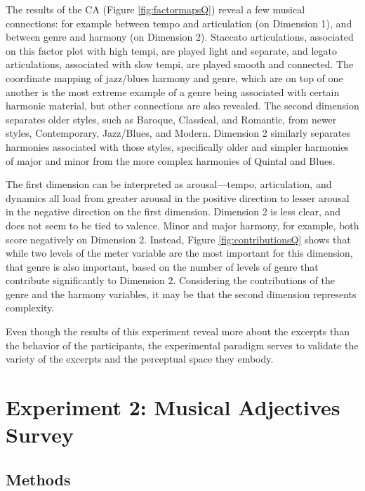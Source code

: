 \documentclass[
  english,
  man,floatsintext]{apa6}
\begin{document}
The results of the CA (Figure \ref{fig:factormapsQ}) reveal a few musical connections: for example between tempo and articulation (on Dimension 1), and between genre and harmony (on Dimension 2). Staccato articulations, associated on this factor plot with high tempi, are played light and separate, and legato articulations, associated with slow tempi, are played smooth and connected. The coordinate mapping of jazz/blues harmony and genre, which are on top of one another is the most extreme example of a genre being associated with certain harmonic material, but other connections are also revealed. The second dimension separates older styles, such as Baroque, Classical, and Romantic, from newer styles, Contemporary, Jazz/Blues, and Modern. Dimension 2 similarly separates harmonies associated with those styles, specifically older and simpler harmonies of major and minor from the more complex harmonies of Quintal and Blues.

The first dimension can be interpreted as arousal---tempo, articulation, and dynamics all load from greater arousal in the positive direction to lesser arousal in the negative direction on the first dimension. Dimension 2 is less clear, and does not seem to be tied to valence. Minor and major harmony, for example, both score negatively on Dimension 2. Instead, Figure \ref{fig:contributionsQ} shows that while two levels of the meter variable are the most important for this dimension, that genre is also important, based on the number of levels of genre that contribute significantly to Dimension 2. Considering the contributions of the genre and the harmony variables, it may be that the second dimension represents complexity.

Even though the results of this experiment reveal more about the excerpts than the behavior of the participants, the experimental paradigm serves to validate the variety of the excerpts and the perceptual space they embody.

\hypertarget{experiment-2-musical-adjectives-survey}{%
\section{Experiment 2: Musical Adjectives Survey}\label{experiment-2-musical-adjectives-survey}}

\hypertarget{methods-1}{%
\subsection{Methods}\label{methods-1}}
\end{document}
